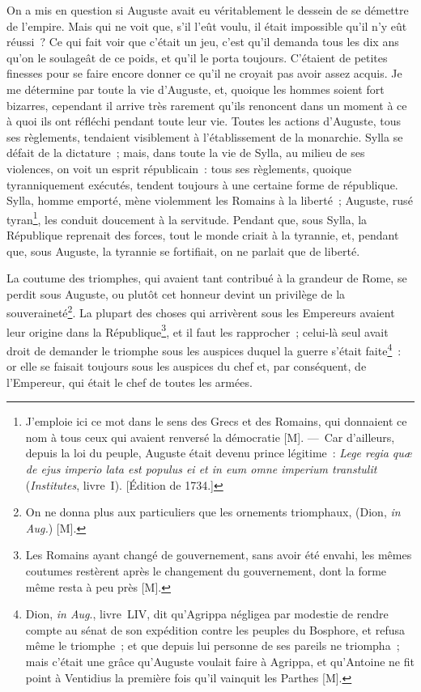 \documentclass[french,twoside]{book} %
\begin{document}
On a mis en question si Auguste avait eu véritablement le dessein de se démettre de l’empire. Mais qui ne voit que, s’il l’eût voulu, il était impossible qu’il n’y eût réussi ? Ce qui fait voir que c’était un jeu, c’est qu’il demanda tous les dix ans qu’on le soulageât de ce poids, et qu’il le porta toujours. C’étaient de petites finesses pour se faire encore donner ce qu’il ne croyait pas avoir assez acquis. Je me détermine par toute la vie d’Auguste, et, quoique les hommes soient fort bizarres, cependant il arrive très rarement qu’ils renoncent dans un moment à ce à quoi ils ont réfléchi pendant toute leur vie. Toutes les actions d’Auguste, tous ses règlements, tendaient visiblement à l’établissement de la monarchie. Sylla se défait de la dictature ; mais, dans toute la vie de Sylla, au milieu de ses violences, on voit un esprit républicain : tous ses règlements, quoique tyranniquement exécutés, tendent toujours à une certaine forme de république. Sylla, homme emporté, mène violemment les Romains à la liberté ; Auguste, rusé tyran\footnote{J’emploie ici ce mot dans le sens des Grecs et des Romains, qui donnaient ce nom à tous ceux qui avaient renversé la démocratie [M]. — Car d’ailleurs, depuis la loi du peuple, Auguste était devenu prince légitime : {\itshape Lege regia quæ de ejus imperio lata est populus ei et in eum omne imperium transtulit} ({\itshape Institutes}, livre I). [Édition de 1734.]}, les conduit doucement à la servitude. Pendant que, sous Sylla, la République reprenait des forces, tout le monde criait à la tyrannie, et, pendant que, sous Auguste, la tyrannie se fortifiait, on ne parlait que de liberté.\par
La coutume des triomphes, qui avaient tant contribué à la grandeur de Rome, se perdit sous Auguste, ou plutôt cet honneur devint un privilège de la souveraineté\footnote{On ne donna plus aux particuliers que les ornements triomphaux, (Dion, {\itshape in Aug.}) [M].}. La plupart des choses qui arrivèrent sous les Empereurs avaient leur origine dans la République\footnote{Les Romains ayant changé de gouvernement, sans avoir été envahi, les mêmes coutumes restèrent après le changement du gouvernement, dont la forme même resta à peu près [M].}, et il faut les rapprocher ; celui-là seul avait droit de demander le triomphe sous les auspices duquel la guerre s’était faite\footnote{Dion, {\itshape in Aug}., livre LIV, dit qu’Agrippa négligea par modestie de rendre compte au sénat de son expédition contre les peuples du Bosphore, et refusa même le triomphe ; et que depuis lui personne de ses pareils ne triompha ; mais c’était une grâce qu’Auguste voulait faire à Agrippa, et qu’Antoine ne fit point à Ventidius la première fois qu’il vainquit les Parthes [M].} : or elle se faisait toujours sous les auspices du chef et, par conséquent, de l’Empereur, qui était le chef de toutes les armées.\par
\end{document}
